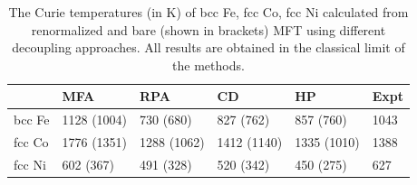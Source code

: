 \documentclass[aps,prb,reprint,floatfix,superscriptaddress]{revtex4-2}
\begin{document}
\begin{table}[t]
    \centering
    \begin{tabular}{ |p{1.2cm}||p{2cm}|p{2cm}|p{2cm}|p{2cm}|p{1.2cm}|}
         \hline
        & \hspace{0.3in}MFA  & \hspace{0.3in}RPA & \hspace{0.32in}CD & \hspace{0.32in}HP & \hspace{0.15in}Expt \\
         \hline
          bcc Fe &   \hspace{0.03in} 1128 (1004)    &  \hspace{0.06in} 730 \hspace{0.06in}(680)  &  \hspace{0.07in} 827 \hspace{0.05in}(762)  &  \hspace{0.04in} 857 \hspace{0.05in}(760)  &  \hspace{0.09in}1043 \\
        fcc Co &    \hspace{0.06in}1776 (1351)   & \hspace{0.03in}1288 (1062)   & \hspace{0.03in}1412 (1140)   &  \hspace{0.02in}1335 (1010)  & \hspace{0.09in}1388 \\
        fcc Ni &  \hspace{0.12in}602 \hspace{0.02in} (367)  &  \hspace{0.05in} 491 \hspace{0.06in}(328)  &  \hspace{0.05in} 520 \hspace{0.05in}(342) & \hspace{0.08in}450 \hspace{0.06in}(275)   & \hspace{0.15in}627 \\
        \hline
    \end{tabular}
    \caption{The Curie temperatures (in K) of bcc Fe, fcc Co, fcc Ni calculated from renormalized and bare (shown in brackets) MFT using different decoupling approaches. All results are obtained in the classical limit of the methods.}
    \label{table:TcMFT}
\end{table}
\end{document}
